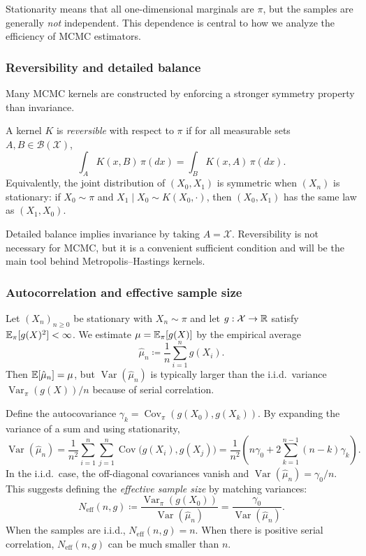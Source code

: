 Stationarity means that all one-dimensional marginals are $\pi$, but the samples are generally \emph{not} independent.
This dependence is central to how we analyze the efficiency of MCMC estimators.

\subsubsection{Reversibility and detailed balance}
\label{subsubsec:detailed-balance}
Many MCMC kernels are constructed by enforcing a stronger symmetry property than invariance.

\begin{definition}
A kernel $K$ is \emph{reversible} with respect to $\pi$ if for all measurable sets $A,B\in\mathcal{B}(\mathcal{X})$,
\[
\int_A K(x,B)\,\pi(dx) = \int_B K(x,A)\,\pi(dx).
\]
Equivalently, the joint distribution of $(X_0,X_1)$ is symmetric when $(X_n)$ is stationary: if $X_0\sim\pi$ and $X_1\mid X_0\sim K(X_0,\cdot)$, then $(X_0,X_1)$ has the same law as $(X_1,X_0)$.
\end{definition}

Detailed balance implies invariance by taking $A=\mathcal{X}$.
Reversibility is not necessary for MCMC, but it is a convenient sufficient condition and will be the main tool behind Metropolis--Hastings kernels.

\subsubsection{Autocorrelation and effective sample size}
\label{subsubsec:ess}
Let $(X_n)_{n\ge 0}$ be stationary with $X_n\sim\pi$ and let $g:\mathcal{X}\to\mathbb{R}$ satisfy $\mathbb{E}_\pi[g(X)^2]<\infty$.
We estimate $\mu=\mathbb{E}_\pi[g(X)]$ by the empirical average
\[
\hat\mu_n \coloneqq \frac{1}{n}\sum_{i=1}^n g(X_i).
\]
Then $\mathbb{E}[\hat\mu_n]=\mu$, but $\operatorname{Var}(\hat\mu_n)$ is typically larger than the i.i.d.\ variance $\operatorname{Var}_\pi(g(X))/n$ because of serial correlation.

Define the autocovariance $\gamma_k=\operatorname{Cov}_\pi(g(X_0),g(X_k))$.
By expanding the variance of a sum and using stationarity,
\begin{equation}
  \operatorname{Var}(\hat\mu_n)
  = \frac{1}{n^2}\sum_{i=1}^n\sum_{j=1}^n \operatorname{Cov}\!\bigl(g(X_i),g(X_j)\bigr)
  = \frac{1}{n^2}\left(n\gamma_0 + 2\sum_{k=1}^{n-1} (n-k)\gamma_k\right).
  \label{eq:mcmc-variance}
\end{equation}
In the i.i.d.\ case, the off-diagonal covariances vanish and $\operatorname{Var}(\hat\mu_n)=\gamma_0/n$.
This suggests defining the \emph{effective sample size} by matching variances:
\[
N_{\mathrm{eff}}(n,g) \coloneqq \frac{\operatorname{Var}_\pi(g(X_0))}{\operatorname{Var}(\hat\mu_n)}
= \frac{\gamma_0}{\operatorname{Var}(\hat\mu_n)}.
\]
When the samples are i.i.d., $N_{\mathrm{eff}}(n,g)=n$.
When there is positive serial correlation, $N_{\mathrm{eff}}(n,g)$ can be much smaller than $n$.

